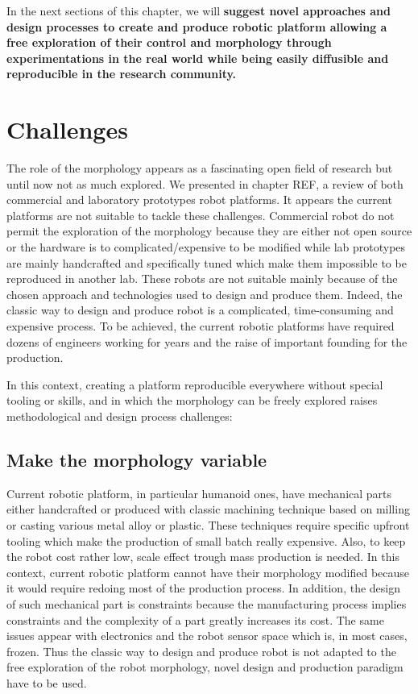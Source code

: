 In the next sections of this chapter, we will \textbf{suggest novel approaches and design processes to create and produce robotic platform  allowing a free exploration of their control and morphology through experimentations in the real world while being easily diffusible and reproducible in the research community.}

\section{Challenges} %

The role of the morphology appears as a fascinating open field of research but until now not as much explored.
We presented in chapter REF, a review of both commercial and laboratory prototypes robot platforms. It appears the current platforms are not suitable to tackle these challenges. Commercial robot do not permit the exploration of the morphology because they are either not open source or the hardware is to complicated/expensive to be modified while lab prototypes are mainly handcrafted and specifically tuned which make them impossible to be reproduced in another lab. These robots are not suitable mainly because of the chosen approach and technologies used to design and produce them.
Indeed, the classic way to design and produce robot is a complicated, time-consuming and expensive process. To be achieved, the current robotic platforms have required dozens of engineers working for years and the raise of important founding for the production.

In this context, creating a platform reproducible everywhere without special tooling or skills, and in which the morphology can be freely explored raises methodological and design process challenges:

\subsection{Make the morphology variable} %

Current robotic platform, in particular humanoid ones, have mechanical parts either handcrafted or produced with classic machining technique based on milling or casting various metal alloy or plastic.
These techniques require specific upfront tooling which make the production of small batch really expensive. Also, to keep the robot cost rather low, scale effect trough mass production is needed. In this context, current robotic platform cannot have their morphology modified because it would require redoing most of the production process. In addition, the design of such mechanical part is constraints because the manufacturing process implies constraints and the complexity of a part greatly increases its cost. The same issues appear with electronics and the robot sensor space which is, in most cases, frozen. Thus the classic way to design and produce robot is not adapted to the free exploration of the robot morphology, novel design and production paradigm have to be used.

